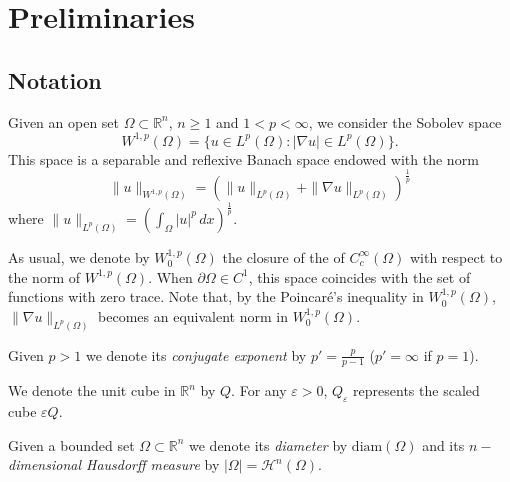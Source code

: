 \documentclass[12pt]{amsart}
\theoremstyle{definition}
\theoremstyle{remark}
\numberwithin{equation}{section}
\begin{document}
\section{Preliminaries} \label{sec.prel}
\subsection{Notation}
Given an open set $\Omega\subset \mathbb R^n$, $n\geq 1$ and $1< p<\infty$, we consider the Sobolev space
$$
W^{1,p}(\Omega)=\{u\in L^p(\Omega)\colon |\nabla u|\in L^p(\Omega) \}.
$$
This space is a separable and reflexive Banach space endowed with the norm 
$$
\|u\|_{W^{1,p}(\Omega)}=(\|u\|_{L^p(\Omega)}+ \|\nabla u\|_{L^p(\Omega)})^\frac1p
$$
where $\|u\|_{L^p (\Omega)} = \left(\int_\Omega |u|^p\,dx\right)^\frac1p$.

As usual, we denote by $W^{1,p}_0(\Omega)$ the closure of the of $C^\infty_c(\Omega)$ with respect to the norm of $W^{1,p}(\Omega)$. When $\partial\Omega\in C^1$, this space coincides with the set of functions with zero trace. Note that, by the Poincar\'e's inequality in $W^{1,p}_0(\Omega)$, $\| \nabla u\|_{L^p(\Omega)}$ becomes an equivalent norm in $W^{1,p}_0(\Omega)$.

\noindent Given $p>1$ we denote its \emph{conjugate exponent} by $p'=\frac{p}{p-1}$ ($p'=\infty$ if $p=1$).


\noindent We denote the unit cube in $\mathbb R^n$ by $Q$. For any $\varepsilon>0$, $Q_\varepsilon$ represents the scaled cube $\varepsilon Q$.

Given a bounded set $\Omega\subset \mathbb R^n$ we denote its \emph{diameter} by $\text{diam}(\Omega)$ and its \emph{$n-$dimensional Hausdorff measure} by $|\Omega|=\mathcal{H}^n(\Omega)$.

\end{document}
